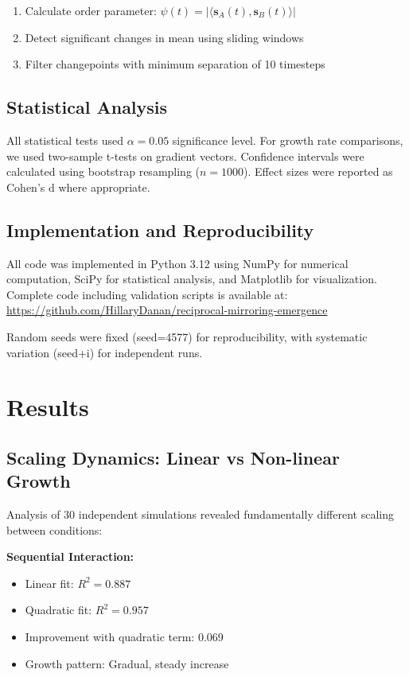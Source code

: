 \documentclass[12pt]{article}
\begin{document}
\begin{enumerate}
\item Calculate order parameter: $\psi(t) = |\langle \mathbf{s}_A(t), \mathbf{s}_B(t) \rangle|$
\item Detect significant changes in mean using sliding windows
\item Filter changepoints with minimum separation of 10 timesteps
\end{enumerate}

\subsection{Statistical Analysis}

All statistical tests used $\alpha = 0.05$ significance level. For growth rate comparisons, we used two-sample t-tests on gradient vectors. Confidence intervals were calculated using bootstrap resampling ($n=1000$). Effect sizes were reported as Cohen's d where appropriate.

\subsection{Implementation and Reproducibility}

All code was implemented in Python 3.12 using NumPy for numerical computation, SciPy for statistical analysis, and Matplotlib for visualization. Complete code including validation scripts is available at: \url{https://github.com/HillaryDanan/reciprocal-mirroring-emergence}

Random seeds were fixed (seed=4577) for reproducibility, with systematic variation (seed+i) for independent runs.

\section{Results}

\subsection{Scaling Dynamics: Linear vs Non-linear Growth}

Analysis of 30 independent simulations revealed fundamentally different scaling between conditions:

\textbf{Sequential Interaction:}
\begin{itemize}
\item Linear fit: $R^2 = 0.887$
\item Quadratic fit: $R^2 = 0.957$
\item Improvement with quadratic term: 0.069
\item Growth pattern: Gradual, steady increase
\end{itemize}
\end{document}
